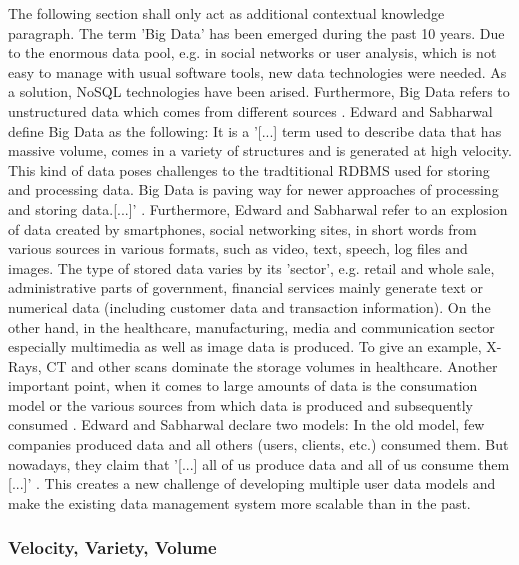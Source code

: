 The following section shall only act as additional contextual knowledge paragraph. 
The term 'Big Data' has been emerged during the past 10 years. Due to the enormous data pool, e.g. in social networks or user analysis, which is not easy to manage with usual software tools, new data technologies were needed. As a solution, NoSQL technologies have been arised. Furthermore, Big Data refers to unstructured data which comes from different sources \cite{nosql_meier}. 
Edward and Sabharwal define Big Data as the following: It is a '[...] term used to describe data that has massive volume, comes in a variety of structures and is generated at high velocity. This kind of data poses challenges to the tradtitional \ac{RDBMS} used for storing and processing data. Big Data is paving way for newer approaches of processing and storing data.[...]' \cite[p.1 ff.]{mongodb_edward}. Furthermore, Edward and Sabharwal refer to an explosion of data created by smartphones, social networking sites, in short words from various sources in various formats, such as video, text, speech, log files and images. The type of stored data varies by its 'sector', e.g. retail and whole sale, administrative parts of government, financial services mainly generate text or numerical data (including customer data and transaction information). On the other hand, in the healthcare, manufacturing, media and communication sector especially multimedia as well as image data is produced. To give an example, X-Rays, CT and other scans dominate the storage volumes in healthcare. 
Another important point, when it comes to large amounts of data is the consumation model or the various sources from which data is produced and subsequently consumed \cite[p.6 ff.]{mongodb_edward}. Edward and Sabharwal declare two models: In the old model, few companies produced data and all others (users, clients, etc.) consumed them. But nowadays, they claim that '[...] all of us produce data and all of us consume them [...]' \cite[p.6 ff.]{mongodb_edward}. This creates a new challenge of developing multiple user data models and make the existing data management system more scalable than in the past. 

\subsubsection{Velocity, Variety, Volume}

